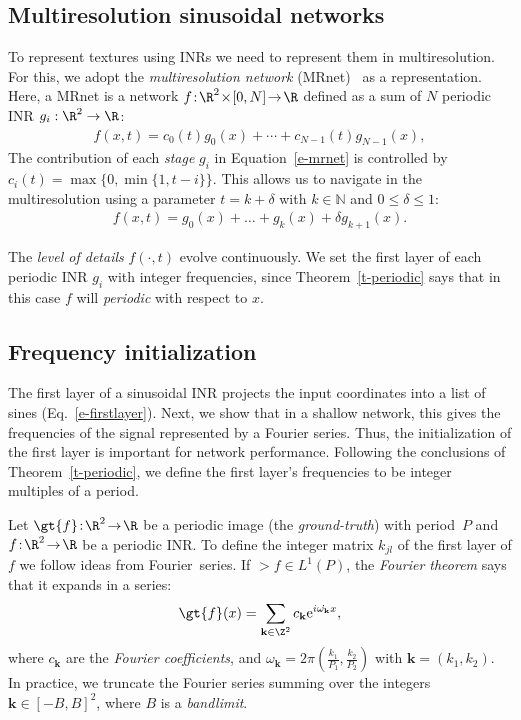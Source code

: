 \subsection{Multiresolution sinusoidal networks}\label{s-mr-networks}
\label{s-multiresolution}
To represent textures using INRs we need to represent them in multiresolution. For this, we adopt the \textit{multiresolution network} (MRnet)~\cite{paz2022} as a representation. Here, a MRnet is a network $f\!:\!\R^2\!\times\! [0,N]\!\to\! \R$ defined as a sum of $N$ periodic INR $g_i:\R^2\to\R$:
\begin{align}\label{e-mrnet}
f(x,t) = c_0(t)g_0(x) + \cdots + c_{N-1}(t)g_{N-1}(x),
\end{align}
The contribution of each \textit{stage} $g_i$ in Equation~\ref{e-mrnet} is controlled by $
c_i(t)\!=\!\max\big\{0, \min\big\{1, t-i\big\}\big\}.$
This allows us to navigate in the multiresolution using a parameter $t\!=\!k+\delta$ with $k\in\mathbb{N}$ and $0\leq\delta\leq 1$:
\begin{align}\label{e-mrnet2}
f(x,t)=g_0(x)+\dots + g_k(x)+\delta g_{k+1}(x).
\end{align}

The \textit{level of details} $f(\cdot, t)$ evolve continuously.
We set the first layer of each periodic INR $g_i$ with integer frequencies, since Theorem~\ref{t-periodic} says that in this case $f$ will \textit{periodic} with respect to $x$.

\subsection{Frequency initialization}
\label{s-initialization}
The first layer of a sinusoidal INR projects the input coordinates into a list of sines (Eq.~\ref{e-firstlayer}). Next, we show that in a shallow network, this gives the frequencies of the signal represented by a Fourier series. Thus, the initialization of the first layer is important for network performance.
Following the conclusions of Theorem~\ref{t-periodic}, we define the first layer's frequencies to be integer multiples of a period.

Let $\gt{f}\!:\!\R^2\!\to\! \R$ be a periodic image (the \textit{ground-truth}) with period~$P$ and ${f}\!:\!\R^2\!\to\! \R$ be a periodic INR.
To define the integer matrix $k_{jl}$ of the first layer of $f$ we follow ideas from Fourier~series.
If $\gt{f}\in L^1(P)$, the \textit{Fourier theorem} says that it expands in a series:
\begin{align}\label{e-fourier-expansion}
    \gt{f}(x)=\sum_{\textbf{k}\in \Z^2} c_\textbf{k} \text{e}^{i\dot{\omega_{{\textbf{k}}}}{ x}},
\end{align}
where $c_\textbf{k}$ are the \textit{Fourier coefficients}, and $\omega_{\textbf{k}}=2\pi\left(\frac{k_1}{P_1}, \frac{k_2}{P_2}\right)$ with $\textbf{k}=(k_1,k_2)$. 
%
In practice, we truncate the Fourier series summing over the integers $\textbf{k}\in[-B, B]^2$, where $B$ is a \textit{bandlimit}.
%

